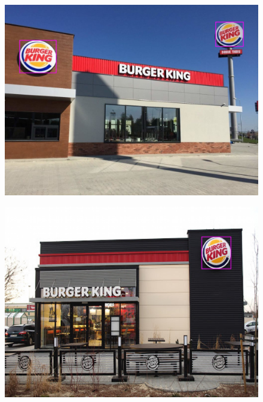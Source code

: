 \begin{figure}[h]
    \centering
    \includegraphics[width=\columnwidth]{figures/results/bk1.jpg}
\end{figure}

\begin{figure}[h]
    \centering
    \includegraphics[width=\columnwidth]{figures/results/bk2.jpg}
    \label{fig:result2}
\end{figure}

